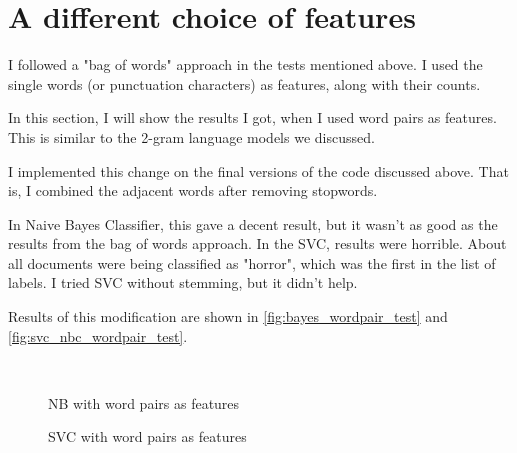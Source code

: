 \section{A different choice of features}

I followed a "bag of words" approach in the tests mentioned above. I used the single words (or punctuation characters) as features, along with their counts.

In this section, I will show the results I got, when I used word pairs as features. This is similar to the 2-gram language models we discussed.

I implemented this change on the final versions of the code discussed above. That is, I combined the adjacent words after removing stopwords.

In Naive Bayes Classifier, this gave a decent result, but it wasn't as good as the results from the bag of words approach. In the SVC, results were horrible. About all documents were being classified as "horror", which was the first in the list of labels. I tried SVC without stemming, but it didn't help.

Results of this modification are shown in \autoref{fig:bayes_wordpair_test} and \autoref{fig:svc_nbc_wordpair_test}.

\

\begin{figure}[htpb]
    \caption{NB with word pairs as features}
    \label{fig:bayes_wordpair_test}
    \begin{tcolorbox}[colback=red!30!white,
            title=NB - Word pairs]
        
    \end{tcolorbox}
\end{figure}

\begin{figure}[htpb]
    \caption{SVC with word pairs as features}
    \label{fig:svc_nbc_wordpair_test}
    \begin{tcolorbox}[colback=red!30!white,
            title=SVC - Word pairs]
        
    \end{tcolorbox}
\end{figure}
